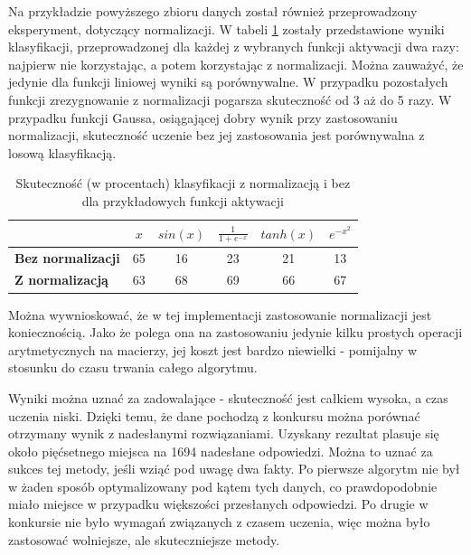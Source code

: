 \documentclass{article}
\begin{document}
Na przykładzie powyższego zbioru danych został również przeprowadzony eksperyment, dotyczący normalizacji.
W tabeli \ref{tab_norm} zostały przedstawione wyniki klasyfikacji, przeprowadzonej dla każdej z wybranych funkcji aktywacji dwa razy: najpierw nie korzystając, a potem korzystając z normalizacji.
Można zauważyć, że jedynie dla funkcji liniowej wyniki są porównywalne.
W przypadku pozostałych funkcji zrezygnowanie z normalizacji pogarsza skuteczność od 3 aż do 5 razy.
W przypadku funkcji Gaussa, osiągającej dobry wynik przy zastosowaniu normalizacji, skuteczność uczenie bez jej zastosowania jest porównywalna z losową klasyfikacją.
\begin{table}[H]
\caption{Skuteczność (w procentach) klasyfikacji z normalizacją i bez dla przykładowych funkcji aktywacji}
\label{tab_norm}
\begin{tabular}{|l|c|c|c|c|c|}
\hline
& $x$ & $sin(x)$ & $\frac{1}{1+e^{-x}}$ & $tanh(x)$ & $e^{-x^2}$ \\
\hline
\textbf{Bez normalizacji} & 65 & 16 & 23 & 21 & 13 \\
\hline
\textbf{Z normalizacją} & 63 & 68 & 69 & 66 & 67 \\
\hline

\hline
\end{tabular}
\end{table}
Można wywnioskować, że w tej implementacji zastosowanie normalizacji jest koniecznością.
Jako że polega ona na zastosowaniu jedynie kilku prostych operacji arytmetycznych na macierzy, jej koszt jest bardzo niewielki - pomijalny w stosunku do czasu trwania całego algorytmu.

Wyniki można uznać za zadowalające - skuteczność jest całkiem wysoka, a czas uczenia niski.
Dzięki temu, że dane pochodzą z konkursu można porównać otrzymany wynik z nadesłanymi rozwiązaniami.
Uzyskany rezultat plasuje się około pięćsetnego miejsca na 1694 nadesłane odpowiedzi.
Można to uznać za sukces tej metody, jeśli wziąć pod uwagę dwa fakty.
Po pierwsze algorytm nie był w żaden sposób optymalizowany pod kątem tych danych, co prawdopodobnie miało miejsce w przypadku większości przesłanych odpowiedzi.
Po drugie w konkursie nie było wymagań związanych z czasem uczenia, więc można było zastosować wolniejsze, ale skuteczniejsze metody.
\end{document}
